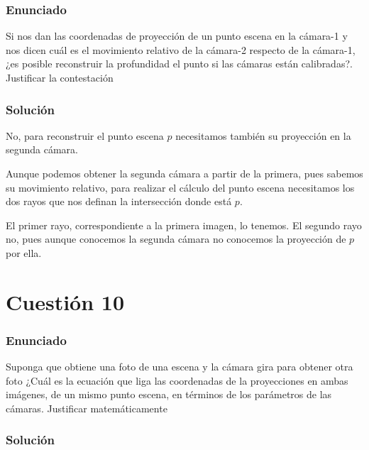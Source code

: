 \subsubsection{Enunciado}

Si nos dan las coordenadas de proyección de un punto escena en la cámara-1 y nos dicen cuál es el movimiento relativo de la cámara-2 respecto de la cámara-1, ¿es posible reconstruir la profundidad el punto si las cámaras están calibradas?. Justificar la contestación


\subsubsection{Solución}

No, para reconstruir el punto escena $p$ necesitamos también su proyección en la segunda cámara.

Aunque podemos obtener la segunda cámara a partir de la primera, pues sabemos su movimiento relativo, para realizar el cálculo del punto escena necesitamos los dos rayos que nos definan la intersección donde está $p$.

El primer rayo, correspondiente a la primera imagen, lo tenemos. El segundo rayo no, pues aunque conocemos la segunda cámara no conocemos la proyección de $p$ por ella.


\section{Cuestión 10}

\subsubsection{Enunciado}

Suponga que obtiene una foto de una escena y la cámara gira para obtener otra foto ¿Cuál es la ecuación que liga las coordenadas de la proyecciones en ambas imágenes, de un mismo punto escena, en términos de los parámetros de las cámaras. Justificar matemáticamente 

\subsubsection{Solución}



